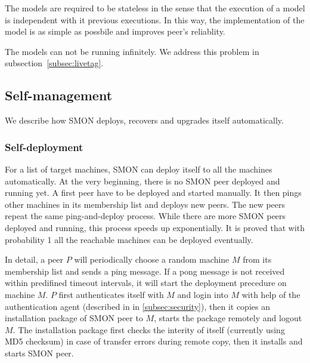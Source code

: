 {The models are required to be stateless in the sense that
the execution of a model is independent with it previous
executions. In this way, the implementation of the model is
as simple as possbile and improves peer's reliablity.



The models can not be running infinitely. We address this
problem in subsection~\ref{subsec:livetag}.
}

\subsection{Self-management}

We describe how SMON deploys, recovers and upgrades itself
automatically.

\subsubsection*{Self-deployment}

For a list of target machines, SMON can deploy itself to all
the machines automatically. At the very beginning, there is
no SMON peer deployed and running yet. A first peer have to
be deployed and started manually. It then pings other
machines in its membership list and deploys new peers. The
new peers repeat the same ping-and-deploy process. While
there are more SMON peers deployed and running, this process
speeds up exponentially. It is proved that with probability
1 all the reachable machines can be deployed
eventually\cite{Eugster2004}.


In detail, a peer $P$ will periodically choose a random
machine $M$ from its membership list and sends a ping
message. If a pong message is not received within predifined
timeout intervals, it will start the deployment precedure on
machine $M$. $P$ first authenticates itself with $M$ and
login into $M$ with help of the authentication agent
(described in in \ref{subsec:security}), then it copies an
installation package of SMON peer to $M$, starts the package
remotely and logout $M$. The installation package first
checks the interity of itself (currently using MD5 checksum)
in case of transfer errors during remote copy, then it
installs and starts SMON peer.

